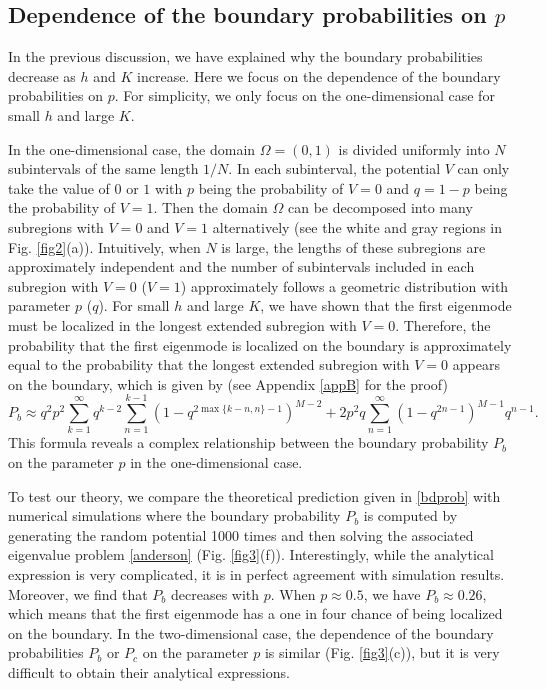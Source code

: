\documentclass[a4paper,11pt]{article}
\begin{document}
\subsection{Dependence of the boundary probabilities on $p$}
In the previous discussion, we have explained why the boundary probabilities decrease as $h$ and $K$ increase. Here we focus on the dependence of the boundary probabilities on $p$. For simplicity, we only focus on the one-dimensional case for small $h$ and large $K$.

In the one-dimensional case, the domain $\Omega = (0, 1)$ is divided uniformly into $N$ subintervals of the same length $1/N$. In each subinterval, the potential $V$ can only take the value of $0$ or $1$ with $p$ being the probability of $V = 0$ and $q = 1-p$ being the probability of $V = 1$. Then the domain $\Omega$ can be decomposed into many subregions with $V = 0$ and $V = 1$ alternatively (see the white and gray regions in Fig. \ref{fig2}(a)). Intuitively, when $N$ is large, the lengths of these subregions are approximately independent and the number of subintervals included in each subregion with $V = 0$ ($V = 1$) approximately follows a geometric distribution with parameter $p$ ($q$). For small $h$ and large $K$, we have shown that the first eigenmode must be localized in the longest extended subregion with $V = 0$. Therefore, the probability that the first eigenmode is localized on the boundary is approximately equal to the probability that the longest extended subregion with $V = 0$ appears on the boundary, which is given by (see Appendix \ref{appB} for the proof)
\begin{equation}\label{bdprob}
P_b \approx q^2 p^2 \sum_{k=1}^{\infty} q^{k-2} \sum_{n=1}^{k-1} (1 - q^{2 \max\{k-n,n\}-1})^{M-2} + 2 p^2 q \sum_{n=1}^{\infty} (1-q^{2n-1})^{M-1} q^{n-1}.
\end{equation}
This formula reveals a complex relationship between the boundary probability $P_b$ on the parameter $p$ in the one-dimensional case.

To test our theory, we compare the theoretical prediction given in \eqref{bdprob} with numerical simulations where the boundary probability $P_b$ is computed by generating the random potential 1000 times and then solving the associated eigenvalue problem \eqref{anderson} (Fig. \ref{fig3}(f)). Interestingly, while the analytical expression is very complicated, it is in perfect agreement with simulation results. Moreover, we find that $P_b$ decreases with $p$. When $p\approx 0.5$, we have $P_b\approx 0.26$, which means that the first eigenmode has a one in four chance of being localized on the boundary. In the two-dimensional case, the dependence of the boundary probabilities $P_b$ or $P_c$ on the parameter $p$ is similar (Fig. \ref{fig3}(c)), but it is very difficult to obtain their analytical expressions.
\end{document}
